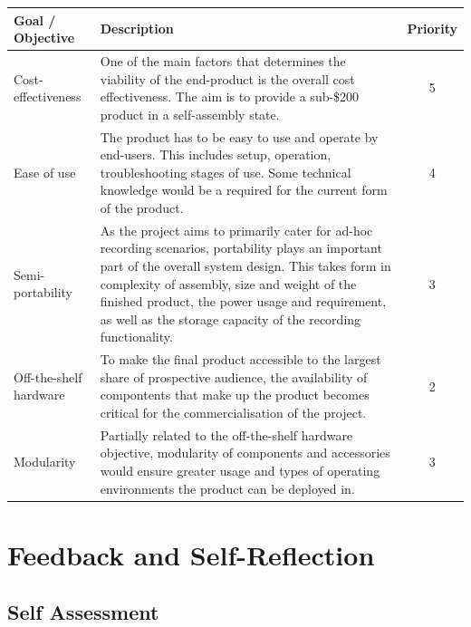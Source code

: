 \documentclass[11pt,a4paper,titlepage]{report}
\begin{document}
\begin{center}
\begin{table}
\begin{tabular}{|l|p{6cm}|c|}
    \hline
    \textbf{Goal / Objective} & \textbf{Description} & \textbf{Priority} \\ \hline
    Cost-effectiveness & One of the main factors that determines the viability of the end-product is the overall cost effectiveness. The aim is to provide a sub-\$200 product in a self-assembly state. & 5  \\ \hline
    
    Ease of use & The product has to be easy to use and operate by end-users. This includes setup, operation, troubleshooting stages of use. Some technical knowledge would be a required for the current form of the product. & 4  \\ \hline
    
    Semi-portability & As the project aims to primarily cater for ad-hoc recording scenarios, portability plays an important part of the overall system design. This takes form in complexity of assembly, size and weight of the finished product, the power usage and requirement, as well as the storage capacity of the recording functionality.& 3  \\ \hline

    Off-the-shelf hardware & To make the final product accessible to the largest share of prospective audience, the availability of compontents that make up the product becomes critical for the commercialisation of the project.& 2   \\ \hline

    Modularity & Partially related to the off-the-shelf hardware objective, modularity of components and accessories would ensure greater usage and types of operating environments the product can be deployed in.& 3  \\ \hline



\end{tabular}
\end{table}
\end{center}

\section{Feedback and Self-Reflection}
\subsection{Self Assessment}
\end{document}
